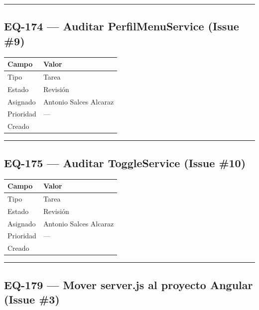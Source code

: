 \documentclass[
  spanish,
  11pt,
]{report}
\newcounter{none} %
\begin{document}
\begin{center}\rule{0.5\linewidth}{0.5pt}\end{center}

\subsection{EQ-174 --- Auditar PerfilMenuService (Issue
\#9)}\label{eq-174-auditar-perfilmenuservice-issue-9}

{\def\LTcaptype{none} %
\begin{longtable}[]{@{}ll@{}}
\toprule\noalign{}
Campo & Valor \\
\midrule\noalign{}
\endhead
\bottomrule\noalign{}
\endlastfoot
Tipo & Tarea \\
Estado & Revisión \\
Asignado & Antonio Salces Alcaraz \\
Prioridad & --- \\
Creado & \\
\end{longtable}
}

\begin{center}\rule{0.5\linewidth}{0.5pt}\end{center}

\subsection{EQ-175 --- Auditar ToggleService (Issue
\#10)}\label{eq-175-auditar-toggleservice-issue-10}

{\def\LTcaptype{none} %
\begin{longtable}[]{@{}ll@{}}
\toprule\noalign{}
Campo & Valor \\
\midrule\noalign{}
\endhead
\bottomrule\noalign{}
\endlastfoot
Tipo & Tarea \\
Estado & Revisión \\
Asignado & Antonio Salces Alcaraz \\
Prioridad & --- \\
Creado & \\
\end{longtable}
}

\begin{center}\rule{0.5\linewidth}{0.5pt}\end{center}

\subsection{EQ-179 --- Mover server.js al proyecto Angular (Issue
\#3)}\label{eq-179-mover-server.js-al-proyecto-angular-issue-3}
\end{document}
